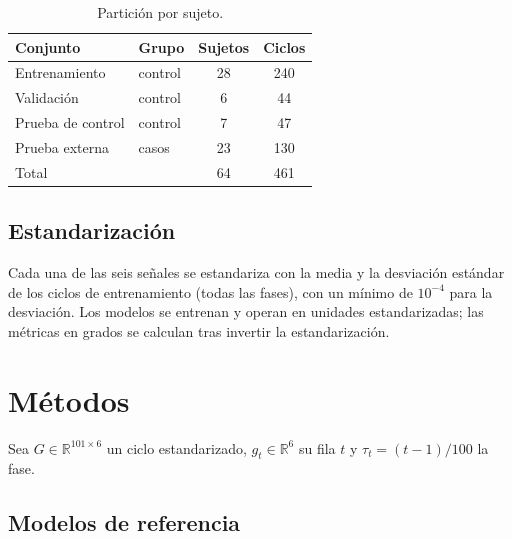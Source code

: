 \documentclass[11pt,a4paper]{amsart}
\newcommand{\R}{\mathbb{R}}
\begin{document}
\begin{table}[h]
\centering\small
\begin{tabular}{llcc}
\toprule
Conjunto & Grupo & Sujetos & Ciclos \\
\midrule
Entrenamiento & control & 28 & 240 \\
Validación & control & 6 & 44 \\
Prueba de control & control & 7 & 47 \\
Prueba externa & casos & 23 & 130 \\
\midrule
Total & & 64 & 461 \\
\bottomrule
\end{tabular}
\caption{Partición por sujeto.}
\label{tab:particion}
\end{table}

\subsection{Estandarización}

Cada una de las seis señales se estandariza con la media y la desviación estándar de los ciclos de entrenamiento (todas las fases), con un mínimo de $10^{-4}$ para la desviación. Los modelos se entrenan y operan en unidades estandarizadas; las métricas en grados se calculan tras invertir la estandarización.

\section{Métodos}
\label{sec:metodos}

Sea $G\in\R^{101\times 6}$ un ciclo estandarizado, $g_t\in\R^6$ su fila $t$ y $\tau_t=(t-1)/100$ la fase.

\subsection{Modelos de referencia}
\end{document}
